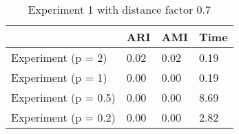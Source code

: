 \begin{table}
\centering
\caption{Experiment 1 with distance factor 0.7}
\begin{tabular}{llll}
\toprule
{} &   ARI &   AMI &  Time \\
\midrule
Experiment (p = 2)   &  0.02 &  0.02 &  0.19 \\
Experiment (p = 1)   &  0.00 &  0.00 &  0.19 \\
Experiment (p = 0.5) &  0.00 &  0.00 &  8.69 \\
Experiment (p = 0.2) &  0.00 &  0.00 &  2.82 \\
\bottomrule
\end{tabular}
\end{table}
